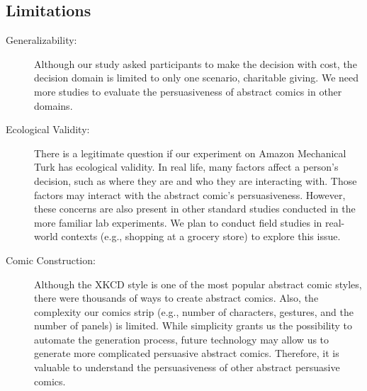 \subsection{Limitations}
\begin{description}
 \item[Generalizability:]  Although our study asked participants to make the decision with cost, the decision domain is limited to only one scenario, charitable giving. We need more studies to evaluate the persuasiveness of abstract comics in other domains.

 \item[Ecological Validity:] There is a legitimate question if our experiment on Amazon Mechanical Turk has ecological validity.  In real life, many factors affect a person's decision, such as where they are and who they are interacting with. Those factors may interact with the abstract comic's persuasiveness. However, these concerns are also present in other standard studies conducted in the more familiar lab experiments. We plan to conduct field studies in real-world contexts (e.g., shopping at a grocery store) to explore this issue.
  
 \item[Comic Construction:] Although the XKCD style is one of the most popular abstract comic styles, there were thousands of ways to create abstract comics. Also, the complexity our comics strip (e.g., number of characters, gestures, and the number of panels) is limited. While simplicity grants us the possibility to automate the generation process, future technology may allow us to generate more complicated persuasive abstract comics. Therefore, it is valuable to understand the persuasiveness of other abstract persuasive comics.
\end{description}
